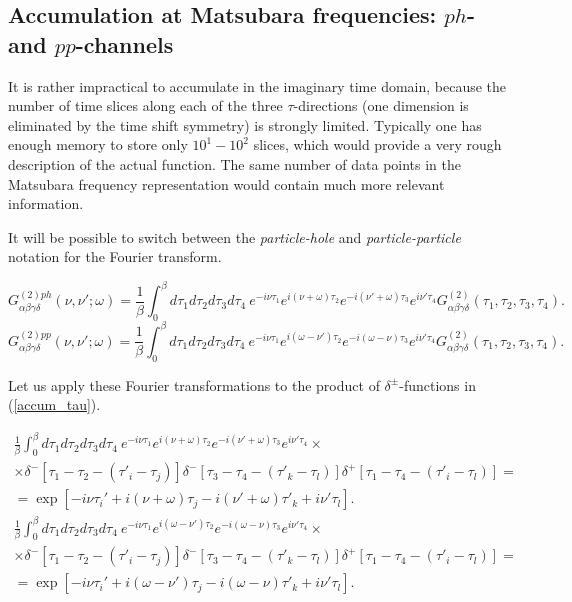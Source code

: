 \documentclass[a4paper,12pt]{article}
\renewcommand{\t}{\ensuremath{\tau}}
\newcommand{\w}{\ensuremath{\omega}}
\begin{document}
\subsection{Accumulation at Matsubara frequencies: $ph$- and $pp$-channels}

It is rather impractical to accumulate in the imaginary time domain, because the number of
time slices along each of the three $\t$-directions (one dimension is eliminated by
the time shift symmetry) is strongly limited. Typically one has enough memory to store only
$10^1-10^2$ slices, which would provide a very rough description of the actual function.
The same number of data points in the Matsubara frequency representation would contain
much more relevant information.

It will be possible to switch between the \textit{particle-hole} and \textit{particle-particle}
notation for the Fourier transform.

\begin{equation}
	G^{(2)ph}_{\alpha\beta\gamma\delta}(\nu,\nu';\w) =
	\frac{1}{\beta}\int_0^\beta d\t_1d\t_2d\t_3d\t_4\
	e^{-i\nu\t_1} e^{i(\nu+\w)\t_2} e^{-i(\nu'+\w)\t_3} e^{i\nu'\tau_4}
	G^{(2)}_{\alpha\beta\gamma\delta}(\t_1,\t_2,\t_3,\t_4).
\end{equation}
\begin{equation}
	G^{(2)pp}_{\alpha\beta\gamma\delta}(\nu,\nu';\w) =
	\frac{1}{\beta}\int_0^\beta d\t_1d\t_2d\t_3d\t_4\
	e^{-i\nu\t_1} e^{i(\w-\nu')\t_2} e^{-i(\w-\nu)\t_3} e^{i\nu'\tau_4}
	G^{(2)}_{\alpha\beta\gamma\delta}(\t_1,\t_2,\t_3,\t_4).
\end{equation}

Let us apply these Fourier transformations to the product of $\delta^\pm$-functions in
(\ref{accum_tau}).

\begin{multline}\label{ph_fourier_kernel}
	\frac{1}{\beta}\int_0^\beta d\t_1d\t_2d\t_3d\t_4\
	e^{-i\nu\t_1} e^{i(\nu+\w)\t_2} e^{-i(\nu'+\w)\t_3} e^{i\nu'\tau_4}\times\\\times
    \delta^-[\t_1 - \t_2 -(\t'_i-\t_j)]\delta^-[\t_3-\t_4-(\t'_k-\t_l)]
    \delta^+[\t_1-\t_4-(\tau'_i-\tau_l)] =\\=
    \exp[-i\nu\t_i' +i(\nu+\w)\t_j - i(\nu'+\w)\t'_k + i\nu'\t_l].
\end{multline}
\begin{multline}\label{pp_fourier_kernel}
	\frac{1}{\beta}\int_0^\beta d\t_1d\t_2d\t_3d\t_4\
	e^{-i\nu\t_1} e^{i(\w-\nu')\t_2} e^{-i(\w-\nu)\t_3} e^{i\nu'\tau_4}\times\\\times
	\delta^-[\t_1 - \t_2 -(\t'_i-\t_j)]\delta^-[\t_3-\t_4-(\t'_k-\t_l)]
	\delta^+[\t_1-\t_4-(\tau'_i-\tau_l)] =\\=
	\exp[-i\nu\t_i' +i(\w-\nu')\t_j - i(\w-\nu)\t'_k + i\nu'\t_l].
\end{multline}
\end{document}
